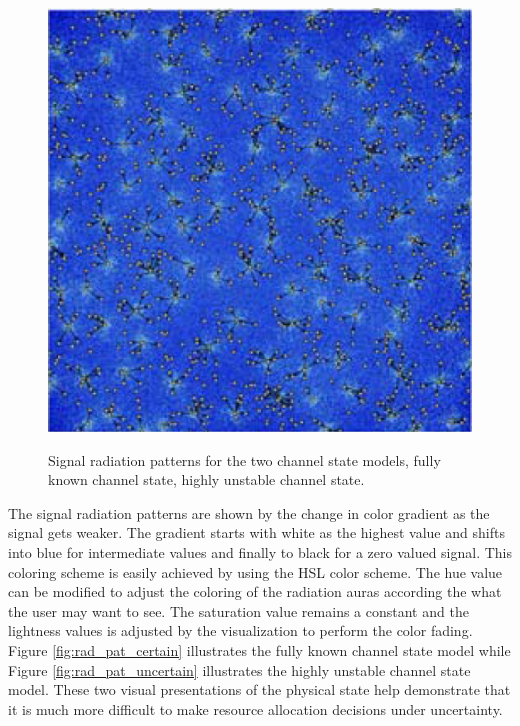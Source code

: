 \begin{figure} [ht]
{		\includegraphics[scale=0.45]{images/network_vis/rad_pat_uncertain.eps}
		\label{fig:rad_pat_uncertain}
	}
\caption{Signal radiation patterns for the two channel state models,  fully known channel state,  highly unstable channel state.}
\label{fig:rad_pat}
\end{figure}

The signal radiation patterns are shown by the change in color gradient as the signal gets weaker.  The gradient starts with white as the highest value and shifts into blue for intermediate values and finally to black for a zero valued signal.  This coloring scheme is easily achieved by using the HSL color scheme.  The hue value can be modified to adjust the coloring of the radiation auras according the what the user may want to see.  The saturation value remains a constant and the lightness values is adjusted by the visualization to perform the color fading.  Figure \ref{fig:rad_pat_certain} illustrates the fully known channel state model while Figure \ref{fig:rad_pat_uncertain} illustrates the highly unstable channel state model.  These two visual presentations of the physical state help demonstrate that it is much more difficult to make resource allocation decisions under uncertainty.

